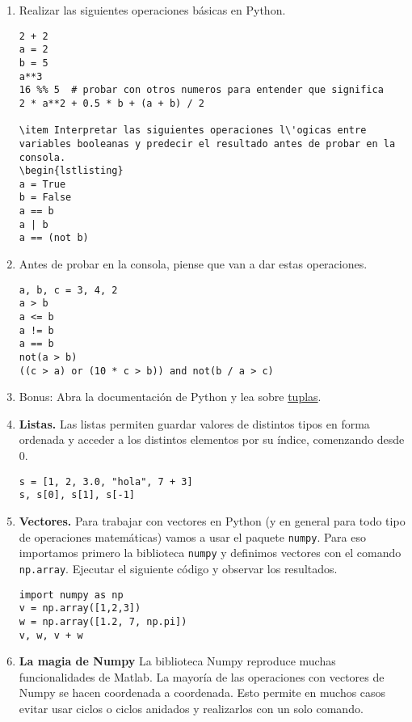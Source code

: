 \documentclass[a4paper,11pt]{article}
\theoremstyle{definition}
\begin{document}
\begin{enumerate}
\item
Realizar las siguientes operaciones básicas en Python.

\begin{lstlisting}
2 + 2
a = 2
b = 5
a**3
16 %% 5  # probar con otros numeros para entender que significa
2 * a**2 + 0.5 * b + (a + b) / 2

\item Interpretar las siguientes operaciones l\'ogicas entre variables booleanas y predecir el resultado antes de probar en la consola.
\begin{lstlisting}
a = True
b = False
a == b
a | b
a == (not b)
\end{lstlisting}

\item Antes de probar en la consola, piense que van a dar estas operaciones.
\begin{lstlisting}
a, b, c = 3, 4, 2
a > b
a <= b
a != b
a == b
not(a > b)
((c > a) or (10 * c > b)) and not(b / a > c)
\end{lstlisting}

\item Bonus: Abra la documentación de Python y lea sobre \href{https://docs.python.org/es/3/library/stdtypes.html\#tuples}{tuplas}.


\item \textbf{Listas.}
Las listas permiten guardar valores de distintos tipos en forma ordenada y acceder a los distintos elementos por su índice, comenzando desde 0.
\begin{lstlisting}
s = [1, 2, 3.0, "hola", 7 + 3]
s, s[0], s[1], s[-1]
\end{lstlisting}


\item \textbf{Vectores.}
Para trabajar con vectores en Python (y en general para todo tipo de operaciones matemáticas) vamos a usar el paquete \lstinline{numpy}. Para eso importamos primero la biblioteca \lstinline{numpy} y definimos vectores con el comando \lstinline{np.array}. Ejecutar el siguiente código y observar los resultados.

\begin{lstlisting}
import numpy as np
v = np.array([1,2,3])
w = np.array([1.2, 7, np.pi])
v, w, v + w
\end{lstlisting}

\item \textbf{La magia de Numpy} La biblioteca Numpy reproduce muchas funcionalidades de Matlab. La mayoría de las operaciones con vectores de Numpy se hacen coordenada a coordenada. Esto permite en muchos casos evitar usar ciclos o ciclos anidados y realizarlos con un solo comando.


\end{enumerate}
\end{document}
